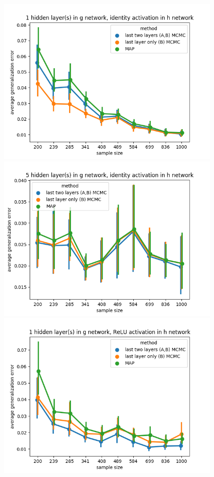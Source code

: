 \documentclass{article} %
\begin{document}
\newpage

\begin{figure}[t!]
	\begin{center}
		\includegraphics[scale=0.4]{taskid0.png}
		\includegraphics[scale=0.4]{taskid1.png}
		\includegraphics[scale=0.4]{taskid2.png}

\end{center}
\end{figure}
\end{document}
